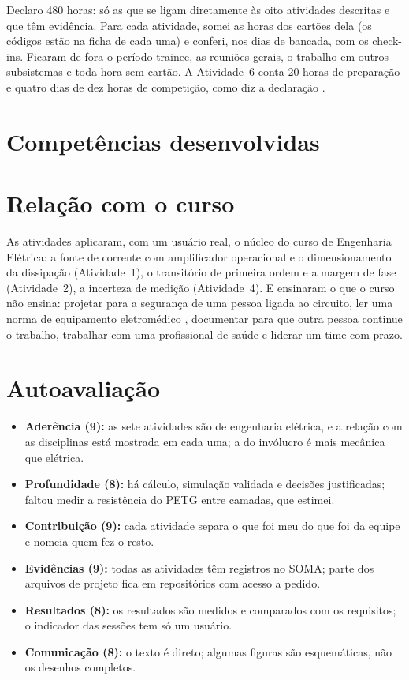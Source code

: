 \documentclass[final,exemplo]{nro-aacc}
\begin{document}
Declaro 480 horas: só as que se ligam diretamente às oito atividades descritas e que têm evidência. Para
cada atividade, somei as horas dos cartões dela (os códigos estão na ficha de cada uma) e conferi, nos
dias de bancada, com os check-ins. Ficaram de fora o período trainee, as reuniões gerais, o trabalho
em outros subsistemas e toda hora sem cartão. A Atividade~6 conta 20 horas de preparação e quatro dias
de dez horas de competição, como diz a declaração .

\section{Competências desenvolvidas}
\matrizcompetencias

\section{Relação com o curso}
\quadrodisciplinas

As atividades aplicaram, com um usuário real, o núcleo do curso de Engenharia Elétrica: a fonte de
corrente com amplificador operacional e o dimensionamento da dissipação (Atividade~1), o transitório de
primeira ordem e a margem de fase (Atividade~2), a incerteza de medição (Atividade~4). E ensinaram o que
o curso não ensina: projetar para a segurança de uma pessoa ligada ao circuito, ler uma norma de
equipamento eletromédico \parencite{iec60601-1,iec60601-2-10}, documentar para que outra pessoa continue
o trabalho, trabalhar com uma profissional de saúde e liderar um time com prazo.

\section{Autoavaliação}
\begin{itemize}
  \item \textbf{Aderência (9):} as sete atividades são de engenharia elétrica, e a relação com as
    disciplinas está mostrada em cada uma; a do invólucro é mais mecânica que elétrica.
  \item \textbf{Profundidade (8):} há cálculo, simulação validada e decisões justificadas; faltou medir a
    resistência do PETG entre camadas, que estimei.
  \item \textbf{Contribuição (9):} cada atividade separa o que foi meu do que foi da equipe e nomeia
    quem fez o resto.
  \item \textbf{Evidências (9):} todas as atividades têm registros no SOMA; parte dos arquivos de
    projeto fica em repositórios com acesso a pedido.
  \item \textbf{Resultados (8):} os resultados são medidos e comparados com os requisitos; o indicador
    das sessões tem só um usuário.
  \item \textbf{Comunicação (8):} o texto é direto; algumas figuras são esquemáticas, não os desenhos
    completos.
\end{itemize}
\end{document}
